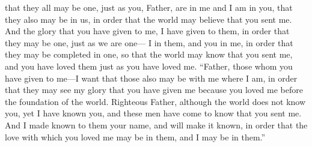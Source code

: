 \begin{biblechapter}
\verse that they all may be one, just as you, Father, are in me and I am in you, that they also may be in us, in order that the world may believe that you sent me.
\verse And the glory that you have given to me, I have given to them, in order that they may be one, just as we are one—
\verse I in them, and you in me, in order that they may be completed in one, so that the world may know that you sent me, and you have loved them just as you have loved me.
\verse “Father, those whom you have given to me—I want that those also may be with me where I am, in order that they may see my glory that you have given me because you loved me before the foundation of the world.
\verse Righteous Father, although the world does not know you, yet I have known you, and these men have come to know that you sent me.
\verse And I made known to them your name, and will make it known, in order that the love with which you loved me may be in them, and I may be in them.”
\end{biblechapter}

